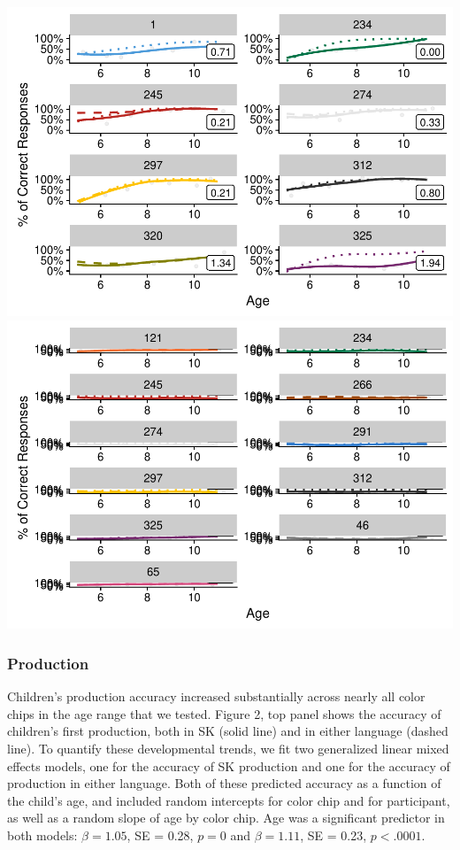 \documentclass[,man,floatsintext]{apa6}
\theoremstyle{definition}
\theoremstyle{definition}
\theoremstyle{definition}
\theoremstyle{remark}
\begin{document}
\includegraphics{amazon_color_files/figure-latex/childfigure-1.pdf}
\includegraphics{amazon_color_files/figure-latex/childfigure-2.pdf}

\subsubsection{Production}\label{production}

Children's production accuracy increased substantially across nearly all
color chips in the age range that we tested. Figure 2, top panel shows
the accuracy of children's first production, both in SK (solid line) and
in either language (dashed line). To quantify these developmental
trends, we fit two generalized linear mixed effects models, one for the
accuracy of SK production and one for the accuracy of production in
either language. Both of these predicted accuracy as a function of the
child's age, and included random intercepts for color chip and for
participant, as well as a random slope of age by color chip. Age was a
significant predictor in both models: \(\beta = 1.05\), SE = 0.28,
\(p = 0\) and \(\beta = 1.11\), SE = 0.23, \(p < .0001\).
\end{document}

